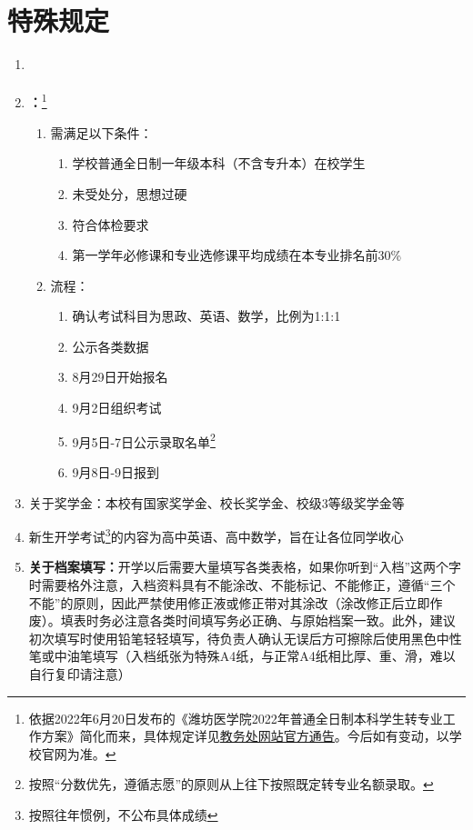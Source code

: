 \section[特殊规定]{特殊规定}
\begin{enumerate}
    \item \textbf{}
    \item \textbf{：}\footnote{依据2022年6月20日发布的《潍坊医学院2022年普通全日制本科学生转专业工作方案》简化而来，具体规定详见\uline{\href{https://jwch.wfmc.edu.cn/2022/0620/c2593a105784/page.htm}{教务处网站官方通告}}。今后如有变动，以学校官网为准。}
          \begin{enumerate}
              \item 需满足以下条件：
                    \begin{enumerate}
                        \item 学校普通全日制一年级本科（不含专升本）在校学生
                        \item 未受处分，思想过硬
                        \item 符合体检要求
                        \item 第一学年必修课和专业选修课平均成绩在本专业排名前30\%
                    \end{enumerate}
              \item 流程：
                    \begin{enumerate}
                        \item 确认考试科目为思政、英语、数学，比例为1:1:1
                        \item 公示各类数据
                        \item 8月29日开始报名
                        \item 9月2日组织考试
                        \item 9月5日-7日公示录取名单\footnote{按照“分数优先，遵循志愿”的原则从上往下按照既定转专业名额录取。}
                        \item 9月8日-9日报到
                    \end{enumerate}
          \end{enumerate}
    \item 关于奖学金：本校有国家奖学金、校长奖学金、校级3等级奖学金等
    \item 新生开学考试\footnote{按照往年惯例，不公布具体成绩}的内容为高中英语、高中数学，旨在让各位同学收心
    \item \textbf{关于档案填写：}开学以后需要大量填写各类表格，如果你听到“入档”这两个字时需要格外注意，入档资料具有不能涂改、不能标记、不能修正，遵循“三个不能”的原则，因此严禁使用修正液或修正带对其涂改（涂改修正后立即作废）。填表时务必注意各类时间填写务必正确、与原始档案一致。此外，建议初次填写时使用铅笔轻轻填写，待负责人确认无误后方可擦除后使用黑色中性笔或中油笔填写（入档纸张为特殊A4纸，与正常A4纸相比厚、重、滑，难以自行复印请注意）

\end{enumerate}
